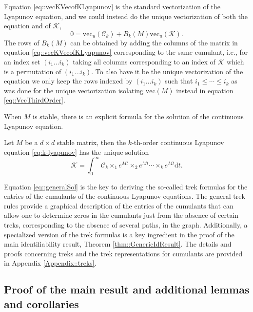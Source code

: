 \documentclass{biometrika}
\begin{document}
Equation \eqref{eq::vecKVecofKLyapunov} is the standard vectorization of the Lyapunov equation, and 
we could instead do the unique vectorization of both the equation and of $\mathcal{K} $,
\begin{equation} \label{eq::Br(M)vec}
    0 = \mathrm{vec}_u(\mathcal{C}_k) + B_k(M) \mathrm{vec}_u(\mathcal{K} ).
\end{equation}
The rows of $B_k(M)$ can be obtained by adding the columns of the matrix in equation \eqref{eq::vecKVecofKLyapunov} corresponding to the same cumulant, i.e., for an index set $(i_1 \dots i_k)$ taking all columns corresponding to an index of $\mathcal{K} $ which is a permutation of $(i_1 \dots i_k)$. To also have it be the unique vectorization of the equation we only keep the rows indexed by $(i_1 \dots i_k)$ such that $i_1 \leq \cdots \leq i_k$ as was done for the unique vectorization isolating $\mathrm{vec}(M)$ instead in equation \eqref{eq::VecThirdOrder}. 



When $M$ is stable, there is an explicit formula for the solution of the continuous Lyapunov equation.
\begin{proposition} \label{prop::XuResult} 
Let $M$ be a  $d \times d$ stable matrix, then the $k$-th-order continuous Lyapunov equation \eqref{eq:k-lyapunov} has the unique solution
\begin{equation}
    \label{eq::generalSol}
    \mathcal{K}  = \int_{0}^{\infty} \mathcal{C}_k \times_1 e^{M t} \times_2 e^{M t} \cdots \times_{k} e^{M t} \mathrm{d} t. 
\end{equation}
\end{proposition}
Equation \eqref{eq::generalSol} is the key to deriving the so-called trek formulas for the entries of the cumulants of the continuous Lyapunov equations. The general trek rules provide a graphical description of the entries of the cumulants that can allow one to determine zeros in the cumulants just from the absence of certain treks, corresponding to the absence of several paths, in the graph. Additionally, 
a specialized version of the trek formulas is a key ingredient in the proof of the main identifiability result, Theorem \ref{thm::GenericIdResult}. The details and proofs concerning treks and the trek representations for cumulants are provided in Appendix \ref{Appendix::treks}. 


\subsection{Proof of the main result and additional lemmas and corollaries} \label{Appendix::MainresultLemmas}
\end{document}
